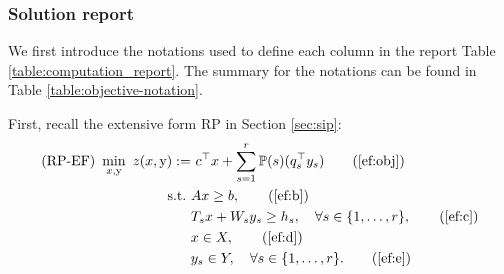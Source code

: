 
\subsubsection{Solution report}
We first introduce the notations used to define each column in the report Table \ref{table:computation_report}. The summary for the notations can be found in Table \ref{table:objective-notation}.

First, recall the extensive form RP in Section \ref{sec:sip}:
\begin{subequations}\label{ef}
	\begin{align}
	\textrm{(RP-EF) }\min_{x,\mathrm{y}}\ z(x,\mathrm{y}):=&\ c^{\top}x + \sum_{s=1}^{r}\PP(s) (q_s^{\top}y_s) \tag{\ref{ef:obj}}\\ 
	\mathrm{s.t.}\ &Ax\ge b,  \tag{\ref{ef:b}}\\
	&T_s x+W_s y_s\ge h_s,\quad\forall s\in\{1,\ldots,r\}, \tag{\ref{ef:c}} \\
	&x\in X, \tag{\ref{ef:d}} \\
	&y_s \in Y,\quad\forall s\in\{1,\ldots,r\}. \tag{\ref{ef:e}}
	\end{align}
\end{subequations}

